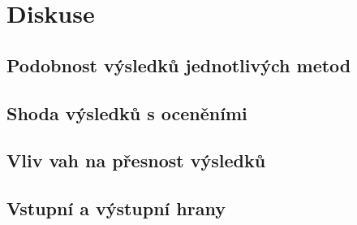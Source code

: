\documentclass{bakalarka}
\begin{document}
\begin{table}[!ht]
\begin{center}
\end{center}
\caption{Tabulka Spearmano koeficientů korelace mezi exaktním a aproximovaným betweenness}
\label{tab:btwA}
\end{table}

\chapter{Diskuse}
\section{Podobnost výsledků jednotlivých metod}
\section{Shoda výsledků s oceněními}
\section{Vliv vah na přesnost výsledků}
\section{Vstupní a výstupní hrany}
\end{document}
